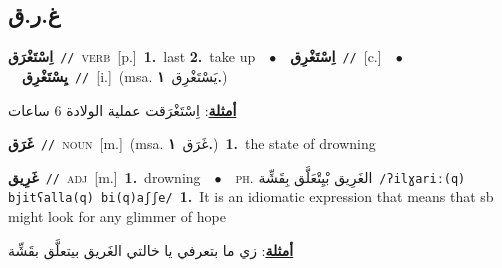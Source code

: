 \documentclass[10pt,a4paper,twoside]{article} %
\begin{document}
\begin{multicols}{2}
\vspace{-3mm}
\subsection*{\color{blue}\foreignlanguage{arabic}{غ.ر.ق}\color{blue}{}} 

{\setlength\topsep{0pt}\textbf{\foreignlanguage{arabic}{اِسْتَغْرَق}}\ {\color{gray}\texttt{//}\color{black}}\ \textsc{verb}\ [p.]\ \textbf{1.}~last  \textbf{2.}~take up\ \ $\bullet$\ \ \setlength\topsep{0pt}\textbf{\foreignlanguage{arabic}{اِسْتَغْرِق}}\ {\color{gray}\texttt{//}\color{black}}\ [c.]\ \ $\bullet$\ \ \setlength\topsep{0pt}\textbf{\foreignlanguage{arabic}{يِسْتَغْرِق}}\ {\color{gray}\texttt{//}\color{black}}\ [i.]\ \color{gray}(msa. \foreignlanguage{arabic}{يَسْتَغْرِق}~\foreignlanguage{arabic}{\textbf{١.}})\color{black}\  \begin{flushright}\color{gray}\foreignlanguage{arabic}{\textbf{\underline{\foreignlanguage{arabic}{أمثلة}}}: اِسْتَغْرَقت عملية الولادة 6 ساعات}\end{flushright}\color{black}} \vspace{2mm}

{\setlength\topsep{0pt}\textbf{\foreignlanguage{arabic}{غَرَق}}\ {\color{gray}\texttt{//}\color{black}}\ \textsc{noun}\ [m.]\ \color{gray}(msa. \foreignlanguage{arabic}{غَرَق}~\foreignlanguage{arabic}{\textbf{١.}})\color{black}\ \textbf{1.}~the state of drowning\ } \vspace{2mm}

{\setlength\topsep{0pt}\textbf{\foreignlanguage{arabic}{غَرِيق}}\ {\color{gray}\texttt{//}\color{black}}\ \textsc{adj}\ [m.]\ \textbf{1.}~drowning\ \ $\bullet$\ \ \textsc{ph.} \color{gray} \foreignlanguage{arabic}{الغَرِيق بْيِتْعَلَّق بِقَشِّة}\color{black}\ {\color{gray}\texttt{/{\sffamily ʔilɣariː(q) bjitʕalla(q) bi(q)aʃʃe}/}\color{black}}\ \textbf{1.}~It is an idiomatic expression that means that sb might look for any glimmer of hope\  \begin{flushright}\color{gray}\foreignlanguage{arabic}{\textbf{\underline{\foreignlanguage{arabic}{أمثلة}}}: زي ما بتعرفي يا خالتي الغَريق بيتعلَّق بقَشِّة}\end{flushright}\color{black}} \vspace{2mm}


\end{multicols}
\end{document}
